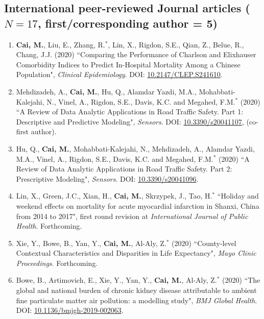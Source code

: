 \documentclass[11pt, a4paper]{article}
\newcommand{\years}[1]{\marginnote{\scriptsize #1}}
\begin{document}
	\subsection*{International peer-reviewed Journal articles ($N=17$, first/corresponding author = 5)}
	\begin{enumerate}[leftmargin=0ex,itemsep=1ex]
		\item \years{2020}\textbf{Cai, M.}, Liu, E., Zhang, R.$^\ast$, Lin, X., Rigdon, S.E., Qian, Z., Belue, R., Chang, J.J. (2020) ``Comparing the Performance of Charlson and Elixhauser Comorbidity Indices to Predict In-Hospital Mortality Among a Chinese Population", \emph{Clinical Epidemiology}. DOI: \href{https://doi.org/10.2147/CLEP.S241610}{10.2147/CLEP.S241610}.
		
		\item Mehdizadeh, A., \textbf{Cai, M.}, Hu, Q., Alamdar Yazdi, M.A., Mohabbati-Kalejahi, N., Vinel, A., Rigdon, S.E., Davis, K.C. and Megahed, F.M.$^\ast$ (2020) ``A Review of Data Analytic Applications in Road Traffic Safety. Part 1: Descriptive and Predictive Modeling", \emph{Sensors}. DOI: \href{https://doi.org/10.3390/s20041107}{10.3390/s20041107}, (co-first author).
		
		\item Hu, Q., \textbf{Cai, M.}, Mohabbati-Kalejahi, N., Mehdizadeh, A., Alamdar Yazdi, M.A., Vinel, A., Rigdon, S.E., Davis, K.C. and Megahed, F.M.$^\ast$ (2020) ``A Review of Data Analytic Applications in Road Traffic Safety. Part 2: Prescriptive Modeling", \emph{Sensors}. DOI: \href{https://doi.org/10.3390/s20041096}{10.3390/s20041096}.
		
		\item Lin, X., Green, J.C., Xian, H., \textbf{Cai, M.}, Skrzypek, J., Tao, H.$^\ast$ ``Holiday and weekend effects on mortality for acute myocardial infarction in Shanxi, China from 2014 to 2017", first round revision at \emph{International Journal of Public Health}. Forthcoming.
		
		\item Xie, Y., Bowe, B., Yan, Y., \textbf{Cai, M.}, Al-Aly, Z.$^\ast$ (2020) ``County-level Contextual Characteristics and Disparities in Life Expectancy", \emph{Mayo Clinic Proceedings}. Forthcoming.
		
		\item Bowe, B., Artimovich, E., Xie, Y., Yan, Y., \textbf{Cai, M.}, Al-Aly, Z.$^\ast$ (2020) ``The global and national burden of chronic kidney disease attributable to ambient fine particulate matter air pollution: a modelling study", \emph{BMJ Global Health}. DOI: \href{https://doi.org/10.1136/bmjgh-2019-002063}{10.1136/bmjgh-2019-002063}.
		

\end{enumerate}
\end{document}
